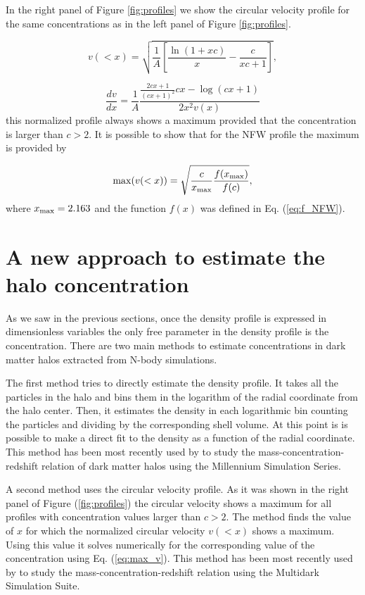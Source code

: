 \documentclass{emulateapj}
\begin{document}
In the right panel of Figure \ref{fig:profiles} we show the circular
velocity profile for the same concentrations as in the left panel of
Figure \ref{fig:profiles}.

\begin{equation}
v(<x)=\sqrt{\frac{1}{A}\left[\frac{\ln\left(1+xc\right)}{x}-\frac{c}{xc+1}\right]},
\end{equation}

\begin{equation}
\frac{dv}{dx}=\frac{1}{A}\frac{\frac{2cx+1}{\left(cx+1\right)^{2}}cx-\log\left(cx+1\right)}{2x^{2}v\left(x\right)}
\end{equation}
%
this normalized profile always shows a maximum provided that the
concentration is larger than $c>2$.
It is possible to show that for the NFW profile the maximum is
provided by

\begin{equation}
\mathrm{max}(v(<x)) = \sqrt{\frac{c}{x_{\rm max}}\frac{f(x_{\rm
      max})}{f(c)}},
\label{eq:max_v}
\end{equation}
where $x_{\rm max}=2.163$ \citep{Klypin2014} and the function $f(x)$
was defined in Eq. (\ref{eq:f_NFW}).

\section{A new approach to estimate the halo concentration}
\label{sec:method}

As we saw in the previous sections, once the density profile is
expressed in dimensionless variables the only free parameter in the
density profile  is the concentration. There are two main methods to
estimate concentrations in dark matter halos extracted from N-body
simulations.

The first method tries to directly estimate the density profile.
It takes all the particles in the halo and bins them in the logarithm
of the radial coordinate from the halo center.
Then, it estimates the density in each logarithmic bin counting the
particles and dividing by the corresponding shell volume.
At this point is is possible to make a direct fit to the density as a
function of the radial coordinate.
This method has been most recently used by \cite{Ludlow2014} to study
the mass-concentration-redshift relation of dark matter halos using
the Millennium Simulation Series.

A second method uses the circular velocity profile.
As it was shown in the right panel of Figure (\ref{fig:profiles}) the
circular velocity shows a maximum for all profiles with concentration
values larger than $c>2$.
The method finds the value of $x$ for which the normalized circular
velocity $v(<x)$ shows a maximum.
Using this value it solves numerically for the corresponding value of
the concentration using Eq. (\ref{eq:max_v}).
This method has been most recently used by \cite{Klypin2014} to study
the mass-concentration-redshift relation using the Multidark
Simulation Suite.
\end{document}
